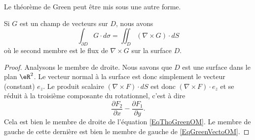 Le théorème de Green peut être mis sous une autre forme.

\begin{theorem}       \label{ThoGreenVectoOM}
    Si $G$ est un champ de vecteurs sur $D$, nous avons
    \begin{equation}        \label{EqGreenVectoOM}
        \int_{\partial D}G\cdot d\sigma=\iint_D(\nabla\times G)\cdot dS
    \end{equation}
    où le second membre est le flux de $\nabla\times G$ sur la surface $D$.
\end{theorem}

\begin{proof}
    Analysons le membre de droite. Nous savons que $D$ est une surface dans le plan $\eR^2$. Le vecteur normal à la surface est donc simplement le vecteur (constant) $e_z$. Le produit scalaire $(\nabla\times F)\cdot dS$ est donc $(\nabla\times F)\cdot e_z$ et se réduit à la troisième composante du rotationnel, c'est à dire
    \begin{equation}
        \frac{ \partial F_2 }{ \partial x }-\frac{ \partial F_1 }{ \partial y }.
    \end{equation}
    Cela est bien le membre de droite de l'équation \eqref{EqThoGreenOM}. Le membre de gauche de cette dernière est bien le membre de gauche de \eqref{EqGreenVectoOM}.
\end{proof}

